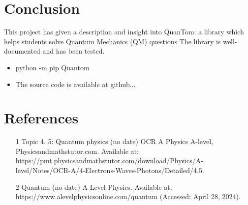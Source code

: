 \documentclass{article}
\begin{document}
\section{Conclusion}
This project has given a description and insight into QuanTom: a library which helps students solve Quantum Mechanics (QM) questions
The library is well-documented and has been tested. 
\begin{itemize}
    \item python -m pip Quantom
    \item The source code is available at github...
\end{itemize}

\section{References}
\begin{enumerate}
    \item [1] Topic 4. 5: Quantum physics (no date) OCR A Physics A-level, Physicsandmathstutor.com. Available at: https://pmt.physicsandmathstutor.com/download/Physics/A-level/Notes/OCR-A/4-Electrons-Waves-Photons/Detailed/4.5.%
    \item [2] Quantum (no date) A Level Physics. Available at: https://www.alevelphysicsonline.com/quantum (Accessed: April 28, 2024).
\end{enumerate}
\end{document}
